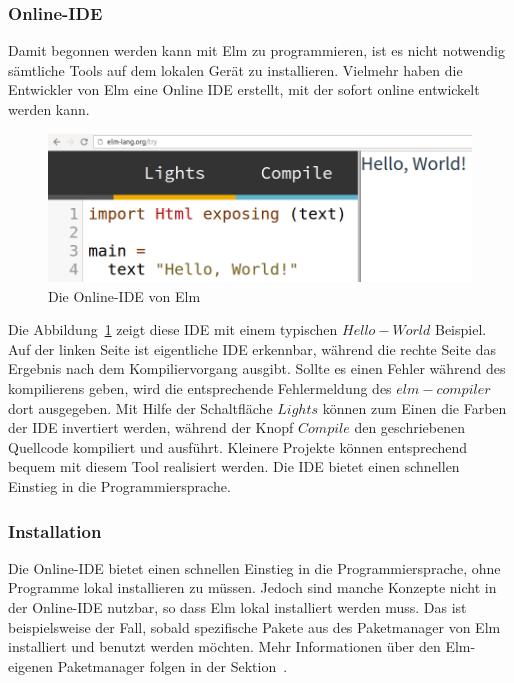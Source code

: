 \subsubsection{Online-IDE}
\label{sec:Online-IDE}
Damit begonnen werden kann mit Elm zu programmieren, ist es nicht notwendig sämtliche Tools auf dem lokalen Gerät zu installieren. Vielmehr haben die Entwickler von Elm eine Online \ac{IDE} erstellt, mit der sofort online entwickelt werden kann.
\begin{figure}[h]
	\centering
	\includegraphics[scale=0.4]{img/elm-try.png}
	\caption{Die Online-\ac{IDE} von Elm}\label{fig:elm-try}
\end{figure}
Die Abbildung~\ref{fig:elm-try} zeigt diese \ac{IDE} mit einem typischen $Hello-World$ Beispiel. Auf der linken Seite ist eigentliche \ac{IDE} erkennbar, während die rechte Seite das Ergebnis nach dem Kompiliervorgang ausgibt. Sollte es einen Fehler während des kompilierens geben, wird die entsprechende Fehlermeldung des $elm-compiler$ dort ausgegeben. Mit Hilfe der Schaltfläche $Lights$ können zum Einen die Farben der \ac{IDE} invertiert werden, während der Knopf $Compile$ den geschriebenen Quellcode kompiliert und ausführt. Kleinere Projekte können entsprechend bequem mit diesem Tool realisiert werden. Die \ac{IDE} bietet einen schnellen Einstieg in die Programmiersprache.


\subsubsection{Installation}
\label{sec:Installation}
Die Online-\ac{IDE} bietet einen schnellen Einstieg in die Programmiersprache, ohne Programme lokal installieren zu müssen. Jedoch sind manche Konzepte nicht in der Online-\ac{IDE} nutzbar, so dass Elm lokal installiert werden muss. Das ist beispielsweise der Fall, sobald spezifische Pakete aus des Paketmanager von Elm installiert und benutzt werden möchten. Mehr Informationen über den Elm-eigenen Paketmanager folgen in der Sektion~.

